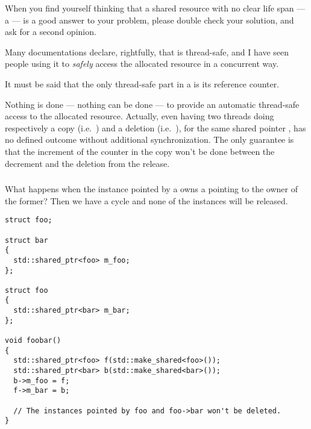 \begin{guideline}
When you find yourself thinking that a shared resource with no clear
life span — a  — is a good answer to your
problem, please double check your solution, and ask for a second
opinion.
\end{guideline}

\begin{pitfall}
Many documentations declare, rightfully, that 
is thread-safe, and I have seen people using it to \emph{safely}
access the allocated resource in a concurrent way.

\bigskip

It must be said that the only thread-safe part in a
 is its reference counter.

\bigskip

Nothing is done — nothing can be done — to provide an automatic
thread-safe access to the allocated resource. Actually, even having
two threads doing respectively a copy (i.e.\ ) and a deletion (i.e.\ ), for the same
shared pointer , has no defined outcome without additional
synchronization. The only guarantee is that the increment of the
counter in the copy won't be done between the decrement and the
deletion from the release.

\end{pitfall}

\subsubsection{}

What happens when the instance pointed by a 
owns a  pointing to the owner of the former?
Then we have a cycle and none of the instances will be released.

\begin{lstlisting}
struct foo;

struct bar
{
  std::shared_ptr<foo> m_foo;
};

struct foo
{
  std::shared_ptr<bar> m_bar;
};

void foobar()
{
  std::shared_ptr<foo> f(std::make_shared<foo>());
  std::shared_ptr<bar> b(std::make_shared<bar>());
  b->m_foo = f;
  f->m_bar = b;

  // The instances pointed by foo and foo->bar won't be deleted.
}
\end{lstlisting}

